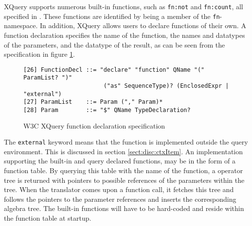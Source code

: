 XQuery supports numerous built-in functions, such as \texttt{fn:not} and \texttt{fn:count}, all
specified in \cite{w3cfuncOps}. These functions are identified by being a member of the \texttt{fn}-namespace. In
addition, XQuery allows users to declare functions of their own. A function declaration specifies the name of the
function, the names and datatypes of the parameters, and the datatype of the result, as can be seen from the
specification in figure \ref{fig:disc:not:funcEBNF}.

\begin{figure}[h]
\begin{Verbatim}
[26] FunctionDecl ::= "declare" "function" QName "(" ParamList? ")" 
                       ("as" SequenceType)? (EnclosedExpr | "external")
[27] ParamList    ::= Param ("," Param)*
[28] Param        ::= "$" QName TypeDeclaration?
\end{Verbatim}
\caption{W3C XQuery function declaration specification\cite{w3c00}\label{fig:disc:not:funcEBNF}}
\end{figure}

The \texttt{external} keyword means that the function is implemented outside the query environment. This is
discussed in section \ref{sect:disc:ctxItem}. An implementation supporting the built-in and query declared
functions, may be in the form of a function table. By querying this table with the name of the function, a
operator tree is returned with pointers to possible references of the parameters within the tree. When the
translator comes upon a function call, it fetches this tree and follows the pointers to the parameter references
and inserts the corresponding algebra tree. The built-in functions will have to be hard-coded and reside within
the function table at startup.
